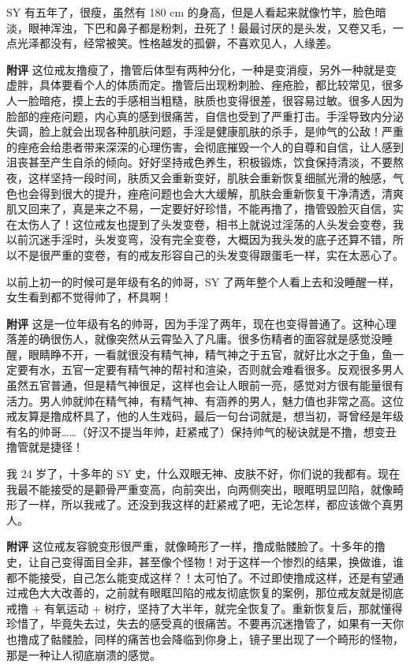 \begin{case}[变丑]
    SY 有五年了，很瘦，虽然有 180 \unit{\cm} 的身高，但是人看起来就像竹竿，脸色暗淡，眼神浑浊，下巴和鼻子都是粉刺，丑死了！最最讨厌的是头发，又卷又毛，一点光泽都没有，经常被笑。性格越发的孤僻，不喜欢见人，人缘差。

    \textbf{附评} 这位戒友撸瘦了，撸管后体型有两种分化，一种是变消瘦，另外一种就是变虚胖，具体要看个人的体质而定。撸管后出现粉刺脸、痤疮脸，都比较常见，很多人一脸暗疮，摸上去的手感相当粗糙，肤质也变得很差，很容易过敏。很多人因为脸部的痤疮问题，内心真的感到很痛苦，自信也受到了严重打击。手淫导致内分泌失调，脸上就会出现各种肌肤问题，手淫是健康肌肤的杀手，是帅气的公敌！严重的痤疮会给患者带来深深的心理伤害，会彻底摧毁一个人的自尊和自信，让人感到沮丧甚至产生自杀的倾向。好好坚持戒色养生，积极锻炼，饮食保持清淡，不要熬夜，这样坚持一段时间，肤质又会重新变好，肌肤会重新恢复细腻光滑的触感，气色也会得到很大的提升，痤疮问题也会大大缓解，肌肤会重新恢复干净清透，清爽肌又回来了，真是来之不易，一定要好好珍惜，不能再撸了，撸管毁脸灭自信，实在太伤人了！这位戒友也提到了头发变卷，相书上就说过淫荡的人头发会变卷，我以前沉迷手淫时，头发变弯，没有完全变卷，大概因为我头发的底子还算不错，所以不是很严重的变卷，有的戒友形容自己的头发变得跟蛋毛一样，实在太恶心了。
\end{case}

\begin{case}[变丑]
    以前上初一的时候可是年级有名的帅哥，SY 了两年整个人看上去和没睡醒一样，女生看到都不觉得帅了，杯具啊！

    \textbf{附评} 这是一位年级有名的帅哥，因为手淫了两年，现在也变得普通了。这种心理落差的确很伤人，就像突然从云霄坠入了凡庸。很多伤精者的面容就是感觉没睡醒，眼睛睁不开，一看就很没有精气神，精气神之于五官，就好比水之于鱼，鱼一定要有水，五官一定要有精气神的帮衬和渲染，否则就会难看很多。反观很多男人虽然五官普通，但是精气神很足，这样也会让人眼前一亮，感觉对方很有能量很有活力。男人帅就帅在精气神，有精气神、有涵养的男人，魅力值也非常之高。这位戒友算是撸成杯具了，他的人生戏码，最后一句台词就是，想当初，哥曾经是年级有名的帅哥……（好汉不提当年帅，赶紧戒了）保持帅气的秘诀就是不撸，想变丑撸管就是捷径！
\end{case}

\begin{case}[变丑]
    我 24 岁了，十多年的 SY 史，什么双眼无神、皮肤不好，你们说的我都有。现在我最不能接受的是颧骨严重变高，向前突出，向两侧突出，眼眶明显凹陷，就像畸形了一样，所以我戒了。还没到我这样的赶紧戒了吧，无论怎样，都应该做个真男人。

    \textbf{附评} 这位戒友容貌变形很严重，就像畸形了一样，撸成骷髅脸了。十多年的撸史，让自己变得面目全非，甚至像个怪物！对于这样一个惨烈的结果，换做谁，谁都不能接受，自己怎么能变成这样？！太可怕了。不过即使撸成这样，还是有望通过戒色大大改善的，之前就有眼眶凹陷的戒友彻底恢复的案例，那位戒友就是彻底戒撸 + 有氧运动 + 树疗，坚持了大半年，就完全恢复了。重新恢复后，那就懂得珍惜了，毕竟失去过，失去的感受真的很痛苦。不要再沉迷撸管了，如果有一天你也撸成了骷髅脸，同样的痛苦也会降临到你身上，镜子里出现了一个畸形的怪物，那是一种让人彻底崩溃的感觉。
\end{case}


